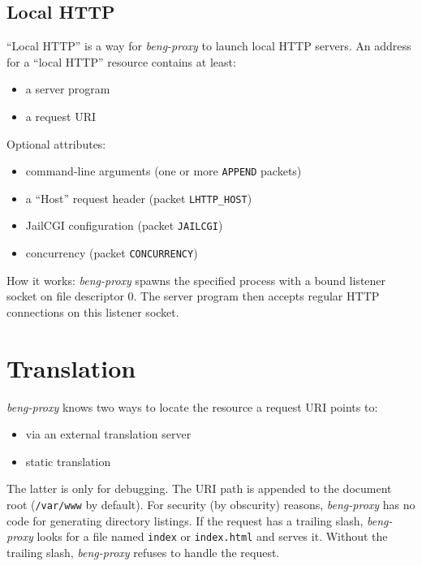 \documentclass[a4paper,12pt]{article}
\begin{document}
\subsection{Local HTTP}
\label{lhttp}

``Local HTTP'' is a way for \emph{beng-proxy} to launch local HTTP
servers.  An address for a ``local HTTP'' resource contains at least:

\begin{itemize}
\item a server program
\item a request URI
\end{itemize}

Optional attributes:

\begin{itemize}
\item command-line arguments (one or more \verb|APPEND| packets)
\item a ``Host'' request header (packet \verb|LHTTP_HOST|)
\item JailCGI configuration (packet \verb|JAILCGI|)
\item concurrency (packet \verb|CONCURRENCY|)
\end{itemize}

How it works: \emph{beng-proxy} spawns the specified process with a
bound listener socket on file descriptor 0.  The server program then
accepts regular HTTP connections on this listener socket.

\section{Translation}

\emph{beng-proxy} knows two ways to locate the resource a request URI
points to:

\begin{itemize}
\item via an external translation server
\item static translation
\end{itemize}

The latter is only for debugging.  The URI path is appended to the
document root (\texttt{/var/www} by default).  For security (by
obscurity) reasons, \emph{beng-proxy} has no code for generating
directory listings.  If the request has a trailing slash,
\emph{beng-proxy} looks for a file named \texttt{index} or
\texttt{index.html} and serves it.  Without the trailing slash,
\emph{beng-proxy} refuses to handle the request.
\end{document}
